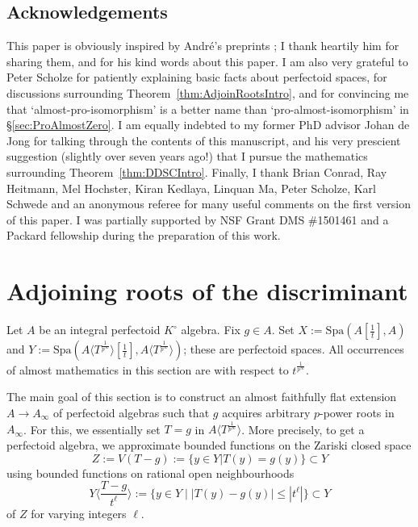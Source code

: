 \documentclass[10pt,reqno]{amsart}
\begin{document}
\subsection*{Acknowledgements} This paper is obviously inspired by Andr\'e's preprints \cite{AndrePAL,AndreDSC}; I thank heartily him for sharing them, and for his kind words about this paper. I am also very grateful to Peter Scholze for patiently explaining basic facts about perfectoid spaces, for discussions surrounding Theorem~\ref{thm:AdjoinRootsIntro}, and for convincing me that `almost-pro-isomorphism' is a better name than `pro-almost-isomorphism' in \S \ref{sec:ProAlmostZero}. I am equally indebted to my former PhD advisor Johan de Jong for talking through the contents of this manuscript, and his very prescient suggestion (slightly over seven years ago!) that I pursue the mathematics surrounding Theorem~\ref{thm:DDSCIntro}.  Finally, I thank Brian Conrad, Ray Heitmann, Mel Hochster, Kiran Kedlaya, Linquan Ma, Peter Scholze, Karl Schwede and an anonymous referee for many useful comments on the first version of this paper. I was partially supported by NSF Grant DMS \#1501461 and a Packard fellowship during the preparation of this work.


\section{Adjoining roots of the discriminant}
\label{sec:AdjoinRootsDisc}

\begin{notation}
Let $A$ be an integral perfectoid $K^\circ$ algebra. Fix $g \in A$. Set $X := \mathrm{Spa}(A[\frac{1}{t}],A)$ and $Y := \mathrm{Spa}(A \langle T^{\frac{1}{p^\infty}} \rangle[\frac{1}{t}], A \langle T^{\frac{1}{p^\infty}} \rangle)$; these are perfectoid spaces. All occurrences of almost mathematics in this section are with respect to $t^{\frac{1}{p^\infty}}$.
\end{notation}

The main goal of this section is to construct an almost faithfully flat extension $A \to A_\infty$ of perfectoid algebras such that $g$ acquires arbitrary $p$-power roots in $A_\infty$. For this, we essentially set $T=g$ in $A\langle T^{\frac{1}{p^\infty}} \rangle$. More precisely,  to get a perfectoid algebra, we approximate bounded functions on the Zariski closed space 
\[ Z := V(T-g) := \{y \in Y | T(y) = g(y)\} \subset Y\]
using bounded functions on rational open neighbourhoods 
\[ Y\langle \frac{T-g}{t^\ell} \rangle := \{y \in Y \mid |T(y) - g(y)| \leq |t^\ell|\} \subset Y\] 
of $Z$ for varying integers $\ell$. 
\end{document}
